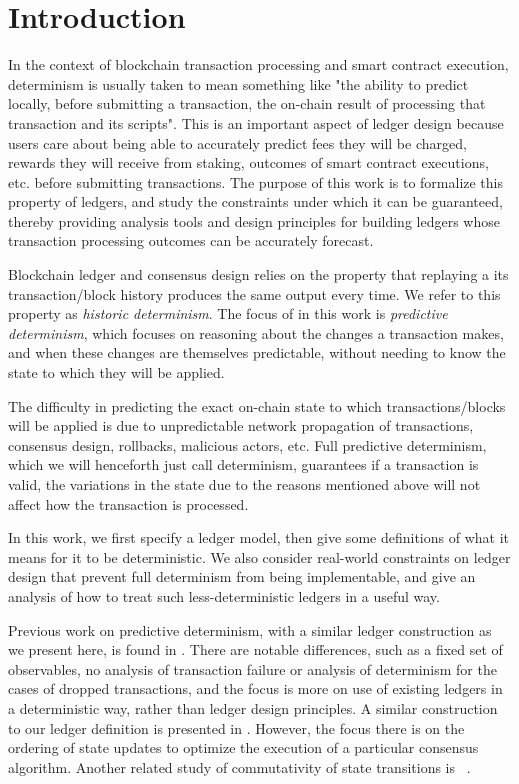 \section{Introduction}
\label{sec:intro}

In the context of blockchain transaction processing and smart contract execution,
determinism is usually taken to mean something like "the ability to predict locally,
before submitting a transaction, the on-chain result of processing that transaction and its scripts".
This is an important aspect of ledger design because users care about being able to accurately predict
fees they will be charged, rewards they will receive from staking, outcomes of
smart contract executions, etc. before submitting transactions. The purpose of this
work is to formalize this property of ledgers, and study the constraints under
which it can be guaranteed, thereby providing analysis tools and design principles for building ledgers
whose transaction processing outcomes can be accurately forecast.

Blockchain ledger and consensus design relies on the property that
replaying a its transaction/block history produces
the same output every time. We refer to this property as \emph{historic determinism}.
The focus of in this work is \emph{predictive determinism}, which focuses on
reasoning about the changes a transaction makes, and when these changes
are themselves predictable, without needing to know the state to which they
will be applied.

The difficulty in predicting
the exact on-chain state to which transactions/blocks will be applied is due to
unpredictable network propagation of transactions, consensus design,
rollbacks, malicious actors, etc. Full predictive determinism, which we will henceforth
just call determinism, guarantees if a transaction
is valid, the variations in the state due to the reasons mentioned above will not
affect how the transaction is processed.

In this work, we first specify a ledger model, then give some definitions of what
it means for it to be deterministic. We also consider real-world constraints
on ledger design that prevent full determinism from being implementable, and
give an analysis of how to treat such less-deterministic ledgers in a useful way.

Previous work on predictive determinism, with a similar ledger construction
as we present here, is found in \cite{parallelism}. There are notable differences,
such as a fixed set of observables, no analysis of transaction failure or analysis
of determinism for the cases of dropped transactions, and the focus is more
on use of existing ledgers in a deterministic way, rather than ledger design
principles.
A similar construction to our ledger definition is presented in \cite{paxos}.
However, the focus there is on the ordering of state updates
to optimize the execution of a particular consensus algorithm.
Another related study of commutativity of state transitions is ~\cite{commautomata}.
